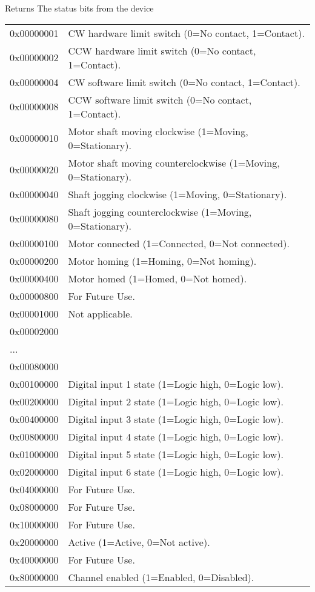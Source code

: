 \begin{DoxyReturn}{Returns}
The status bits from the device \tabulinesep=1mm
\begin{longtabu} spread 0pt [c]{*2{|X[-1]}|}
\hline
0x00000001&CW hardware limit switch (0=No contact, 1=Contact). \\
0x00000002&C\+CW hardware limit switch (0=No contact, 1=Contact). \\
0x00000004&CW software limit switch (0=No contact, 1=Contact). \\
0x00000008&C\+CW software limit switch (0=No contact, 1=Contact). \\
0x00000010&Motor shaft moving clockwise (1=Moving, 0=Stationary). \\
0x00000020&Motor shaft moving counterclockwise (1=Moving, 0=Stationary). \\
0x00000040&Shaft jogging clockwise (1=Moving, 0=Stationary). \\
0x00000080&Shaft jogging counterclockwise (1=Moving, 0=Stationary). \\
0x00000100&Motor connected (1=Connected, 0=Not connected). \\
0x00000200&Motor homing (1=Homing, 0=Not homing). \\
0x00000400&Motor homed (1=Homed, 0=Not homed). \\
0x00000800&For Future Use. \\
0x00001000&Not applicable. \\
0x00002000&\\
...&\\
0x00080000&\\
0x00100000&Digital input 1 state (1=Logic high, 0=Logic low). \\
0x00200000&Digital input 2 state (1=Logic high, 0=Logic low). \\
0x00400000&Digital input 3 state (1=Logic high, 0=Logic low). \\
0x00800000&Digital input 4 state (1=Logic high, 0=Logic low). \\
0x01000000&Digital input 5 state (1=Logic high, 0=Logic low). \\
0x02000000&Digital input 6 state (1=Logic high, 0=Logic low). \\
0x04000000&For Future Use. \\
0x08000000&For Future Use. \\
0x10000000&For Future Use. \\
0x20000000&Active (1=Active, 0=Not active). \\
0x40000000&For Future Use. \\
0x80000000&Channel enabled (1=Enabled, 0=Disabled). \\
\end{longtabu}



\end{DoxyReturn}
